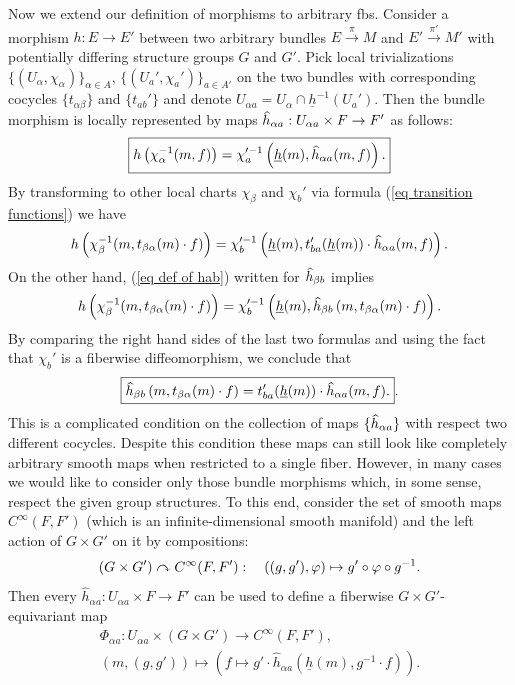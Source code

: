Now we extend our definition of morphisms to arbitrary \glspl{fb}. Consider a morphism $h:E\to E'$ between two arbitrary bundles $E\overset{\pi}{\to}M$ and $E'\overset{\pi'}{\to}M'$ with potentially differing structure groups $G$ and $G'$. Pick local trivializations $\{(U_\alpha,\chi_\alpha)\}_{\alpha\in A}$, $\{(U_a',\chi_a')\}_{a\in A'}$ on the two bundles with corresponding cocycles $\{t_{\alpha\beta}\}$ and $\{t_{ab}'\}$ and denote $U_{\alpha a}=U_\alpha\cap \underline{h}^{-1}(U_a')$. Then the bundle morphism is locally represented by maps
$\wh{h}_{\alpha a}:U_{\alpha a}\times F\to F'$ as follows: 
\[\boxed{h\left(\chi_\alpha^{-1}(m,f)\right)=\chi_a^{\prime-1}\left(\underline{h}(m),\wh{h}_{\alpha a}(m,f)\right).}\label{eq def of hab}\]
By transforming to other local charts $\chi_\beta$ and $\chi_b'$ via formula (\ref{eq transition functions}) we have
\[h\left(\chi_\beta^{-1}(m,t_{\beta\alpha}(m)\cdot f)\right)=\chi_b^{\prime-1}\left(\underline{h}(m),t_{ba}'(\underline{h}(m))\cdot\wh{h}_{\alpha a}(m,f)\right).\]
On the other hand, (\ref{eq def of hab}) written for $\wh{h}_{\beta b}$ implies
\[h\left(\chi_\beta^{-1}(m,t_{\beta\alpha}(m)\cdot f)\right)=\chi_b^{\prime-1}\left(\underline{h}(m),\wh{h}_{\beta b}\left(m,t_{\beta\alpha}(m)\cdot f\right)\right).\]
By comparing the right hand sides of the last two formulas and using the fact that $\chi_b'$ is a fiberwise diffeomorphism, we conclude that
\[\boxed{\wh{h}_{\beta b}\left(m,t_{\beta\alpha}(m)\cdot f\right)=t_{ba}'(\underline{h}(m))\cdot \wh{h}_{\alpha a}(m,f).}\label{eq transformation of hab}.\]
This is a complicated condition on the collection of maps $\{\wh{h}_{\alpha a}\}$ with respect two different cocycles. Despite this condition these maps can still look like completely arbitrary smooth maps when restricted to a single fiber. However, in many cases we would like to consider only those bundle morphisms which, in some sense, respect the given group structures. To this end, consider the set of smooth maps $C^\infty(F,F')$ (which is an infinite-dimensional smooth manifold) and the left action of $G\times G'$ on it by compositions:
\[(G\times G')\curvearrowright C^\infty(F,F'):\quad ((g,g'),\varphi)\mapsto g'\circ \varphi\circ g^{-1}.\]
Then every $\hat{h}_{\alpha a}:U_{\alpha a}\times F\to F'$ can be used to define a fiberwise $G\times G'$-equivariant map
\begin{gather}
    \Phi_{\alpha a}: U_{\alpha a}\times (G\times G')\to C^\infty(F,F'),\\
    (m,(g,g'))\mapsto \left(f\mapsto g'\cdot \hat{h}_{\alpha a}\left(\underline{h}(m),g^{-1}\cdot f\right)\right).\label{def Phiab}
\end{gather}
